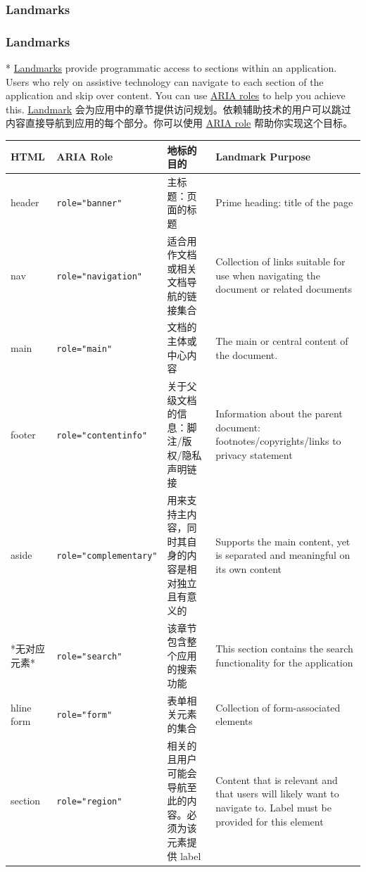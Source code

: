 \begin{paracol}{2}
\subsubsection{Landmarks}
\switchcolumn
\subsubsection{Landmarks}
\switchcolumn[0]*%
\href{https://developer.mozilla.org/en-US/docs/Web/Accessibility/ARIA/Roles/landmark_role}{Landmarks}
provide programmatic access to sections within an application. Users who
rely on assistive technology can navigate to each section of the
application and skip over content. You can use
\href{https://developer.mozilla.org/en-US/docs/Web/Accessibility/ARIA/Roles}{ARIA
roles} to help you achieve this.
\switchcolumn
\href{https://developer.mozilla.org/en-US/docs/Web/Accessibility/ARIA/Roles/landmark_role}{Landmark}
会为应用中的章节提供访问规划。依赖辅助技术的用户可以跳过内容直接导航到应用的每个部分。你可以使用
\href{https://developer.mozilla.org/en-US/docs/Web/Accessibility/ARIA/Roles}{ARIA
role} 帮助你实现这个目标。
\end{paracol}


\begingroup
\LTleft=0pt \LTright=0pt
\begin{longtable}{@{\extracolsep{\fill}}|p{}|p{}|p{}|p{}|}
\hline
HTML&ARIA Role&地标的目的&Landmark Purpose\\\hline
header       & \verb|role="banner"|        & 主标题：页面的标题& Prime heading: title of the page\\\hline
nav          & \verb|role="navigation"|    & 适合用作文档或相关文档导航的链接集合 &Collection of links suitable for use when navigating the document or related documents  \\\hline
main         & \verb|role="main"|          & 文档的主体或中心内容  &The main or central content of the document. \\\hline
footer       & \verb|role="contentinfo"|   & 关于父级文档的信息：脚注/版权/隐私声明链接&Information about the parent document: footnotes/copyrights/links to privacy statement \\\hline
aside        & \verb|role="complementary"| & 用来支持主内容，同时其自身的内容是相对独立且有意义的 &Supports the main content, yet is separated and meaningful on its own content  \\\hline
*无对应元素*      & \verb|role="search"|        & 该章节包含整个应用的搜索功能 &This section contains the search functionality for the application\\hline
form         & \verb|role="form"|          & 表单相关元素的集合 &Collection of form-associated elements                                       \\\hline
section      & \verb|role="region"|        & 相关的且用户可能会导航至此的内容。必须为该元素提供 label&Content that is relevant and that users will likely want to navigate to. Label must be provided for this element \\\hline
\end{longtable}
\endgroup


